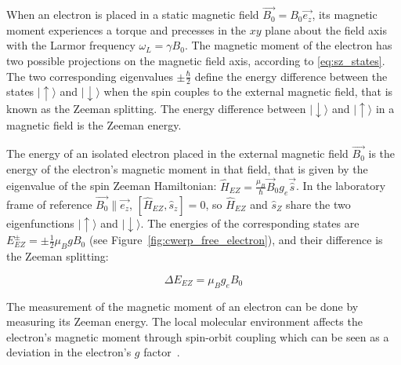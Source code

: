 When an electron is placed in a static magnetic field $\vec{B_0}=B_0 \vec{e_z}$, its magnetic moment experiences a torque and precesses in the $xy$ plane about the field axis with the Larmor frequency $\omega_L = \gamma B_0$. The magnetic moment of the electron has two possible projections on the magnetic field axis, according to \ref{eq:sz_states}. The two corresponding eigenvalues $\pm\frac{\hbar}{2}$ define the energy difference between the states $\vert{\uparrow\rangle}$ and $\vert{\downarrow\rangle}$ when the spin couples to the external magnetic field, that is known as the Zeeman splitting. The energy difference between $\vert{\downarrow}\rangle$ and $\vert{\uparrow}\rangle$ in a magnetic field is the Zeeman energy. 

\par

The energy of an isolated electron placed in the external magnetic field $\vec{B_0}$ is the energy of the electron's magnetic moment in that field, that is given by the eigenvalue of the spin Zeeman Hamiltonian: $\hat{H}_{EZ} = \frac{\mu_B}{\hbar} \vec{B}_0g_e\vec{\hat{s}}$. In the laboratory frame of reference $\vec{B_0}\parallel\vec{e_z}$, $\left[\hat{H}_{EZ},\hat{s}_z\right]=0$, so $\hat{H}_{EZ}$ and $\hat{s}_Z$ share the two eigenfunctions $\vert{\uparrow\rangle}$ and $\vert{\downarrow\rangle}$. The energies of the corresponding states are $E_{EZ}^{\pm} = \pm \frac{1}{2}\mu_B g B_0$ (see Figure~\ref{fig:cwerp_free_electron}), and their difference is the Zeeman splitting:

\begin{equation}
\label{eq:electron_zeeman}
\Delta E_{EZ} = \mu_B g_e B_0
\end{equation}

The measurement of the magnetic moment of an electron can be done by measuring its Zeeman energy. The local molecular environment affects the electron's magnetic moment through spin-orbit coupling which can be seen as a deviation in the electron's $g$ factor~\cite{Carrington_g_factor}.




